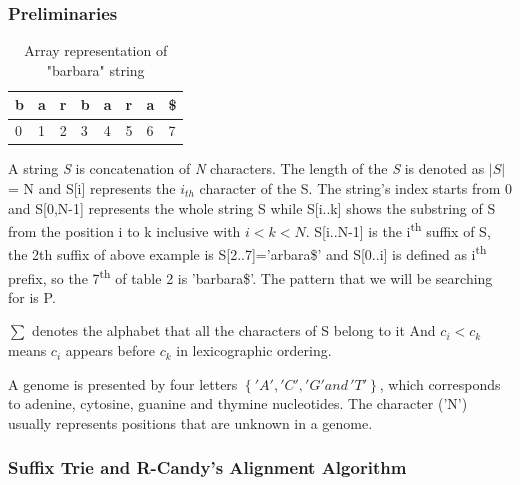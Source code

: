 \documentclass[11pt,a4paper]{report}
\begin{document}

\subsubsection{Preliminaries} \label{Preliminaries}

\begin{table}[h]
 \centering
  \begin{tabular}{ | p{0.5cm} | p{0.5cm} | p{0.5cm} 
  |p{0.5cm} |p{0.5cm} |p{0.5cm} |p{0.5cm} |p{0.5cm} |}
    \hline
  \textbf{b} & \textbf{a } &\textbf{r}  &\textbf{b} 
  &\textbf{a} &\textbf{r} &\textbf{a} &\textbf{\$}\\ \hline
       0 & 1 &2&3&4&5&6&7 \\ \hline
      
   \end{tabular}
\caption{Array representation of "barbara" string}
\label{Array-representation}
\end{table}



A string \emph{S} is concatenation of \emph{N} characters. 
The length of the \emph{S} is denoted as $\lvert S \rvert$ 
= N and S[i] represents the $i_{th}$ character of the S.
The string's index starts from 0 and S[0,N-1] represents 
the whole string S while S[i..k] shows the substring of S 
from the position i to k inclusive with $i < k < N$. 
S[i..N-1] is the i\textsuperscript{th} suffix of S, the 
2th suffix of above example is S[2..7]='arbara\$' and
S[0..i] is defined as i\textsuperscript{th} prefix, so 
the 7\textsuperscript{th} of table 2 is 'barbara\$'.
The pattern that we will be searching for is P.

$ \sum $  denotes the alphabet that all the characters of 
S belong to it And $ c_{i} < c_{k}$ means $c_{i}$ appears 
before $c_{k}$ in lexicographic ordering.

A genome is presented by four letters $\left\{ 'A', 'C', 
'G' and\,'T'\right\}$, which corresponds to adenine, cytosine, 
guanine and thymine nucleotides. The character ('N') usually 
represents positions that are unknown in a genome.





\subsubsection{Suffix Trie and R-Candy's Alignment Algorithm} 
\label{Suffix Trie and R-Candy's Alignment Algorithm}
\end{document}

